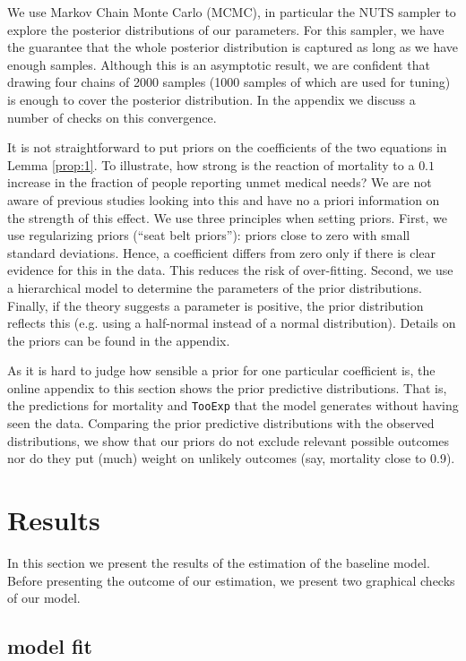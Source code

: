 \documentclass[a4paper,12pt]{article}
\begin{document}
We use Markov Chain Monte Carlo (MCMC), in particular the NUTS sampler to explore the posterior distributions of our parameters. For this sampler, we have the guarantee that the whole posterior distribution is captured as long as we have enough samples. Although this is an asymptotic result, we are confident that drawing four chains of 2000 samples (1000 samples of which are used for tuning) is enough to cover the posterior distribution. In the appendix we discuss a number of checks on this convergence.

It is not straightforward to put priors on the coefficients of the two equations in Lemma \ref{prop:1}. To illustrate, how strong is the reaction of mortality to a \(0.1\) increase in the fraction of people reporting unmet medical needs? We are not aware of previous studies looking into this and have no a priori information on the strength of this effect. We use three principles when setting priors. First, we use regularizing priors (``seat belt priors''): priors close to zero with small standard deviations. Hence, a coefficient differs from zero only if there is clear evidence for this in the data. This reduces the risk of over-fitting. Second, we use a hierarchical model to determine the parameters of the prior distributions. Finally, if the theory suggests a parameter is positive, the prior distribution reflects this (e.g. using a half-normal instead of a normal distribution). Details on the priors can be found in the appendix.

As it is hard to judge how sensible a prior for one particular coefficient is, the online appendix to this section shows the prior predictive distributions. That is, the predictions for mortality and \texttt{TooExp} that the model generates without having seen the data. Comparing the prior predictive distributions with the observed distributions, we show that our priors do not exclude relevant possible outcomes nor do they put (much) weight on unlikely outcomes (say, mortality close to 0.9).

\section{Results}
\label{sec:org0291fc7}

In this section we present the results of the estimation of the baseline model. Before presenting the outcome of our estimation, we present two graphical  checks of our model.

\subsection{model fit}
\label{sec:org9040555}
\end{document}
